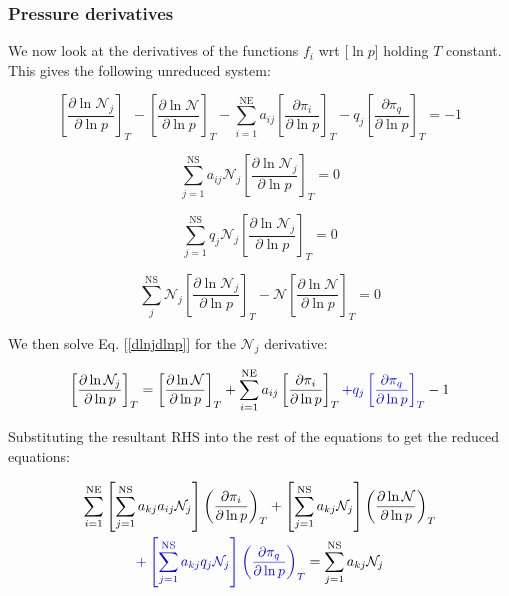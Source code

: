\documentclass[10pt]{article}
\begin{document}
\begin{flushleft}
\subsubsection{Pressure derivatives}
We now look at the derivatives of the functions $f_i$ wrt [$\ln p$] holding $T$ constant. This gives the following unreduced system:

\begin{equation}
\left[\frac{\partial \ln \mathcal{N}_j}{\partial \ln p}\right]_T - \left[ \frac{\partial \ln \mathcal{N}}{\partial \ln p} \right]_T - \sum_{i=1}^\text{NE} a_{ij} \left[ \frac{\partial \pi_i}{\partial \ln p} \right]_T - q_j \left[ \frac{\partial \pi_q}{\partial \ln p} \right]_T = -1 \label{dlnjdlnp}
\end{equation}

\begin{equation}
    \sum_{j=1}^\text{NS} a_{ij} \mathcal{N}_j \left[ \frac{\partial \ln \mathcal{N}_j}{\partial \ln p} \right]_T = 0 
\end{equation}

\begin{equation}
\sum_{j=1}^\text{NS} q_j \mathcal{N}_j \left[ \frac{\partial \ln \mathcal{N}_j}{\partial \ln p} \right]_T = 0 
\end{equation}

\begin{equation}
\sum_j^\text{NS} \mathcal{N}_j \left[ \frac{\partial \ln \mathcal{N}_j}{\partial \ln p} \right]_T - \mathcal{N} \left[ \frac{\partial \ln \mathcal{N}}{\partial \ln p} \right]_T = 0
\end{equation}

We then solve Eq. [\ref{dlnjdlnp}] for the $\mathcal{N}_j$ derivative:

\begin{equation}
    \left[\frac{\partial \ln \mathcal{N}_j}{\partial \ln p}\right]_T = \left[ \frac{\partial \ln \mathcal{N}}{\partial \ln p} \right]_T + \sum_{i=1}^\text{NE} a_{ij} \left[ \frac{\partial \pi_i}{\partial \ln p} \right]_T \textcolor{blue}{+ q_j \left[ \frac{\partial \pi_q}{\partial \ln p} \right]_T} - 1 
\end{equation}

Substituting the resultant RHS into the rest of the equations to get the reduced equations:

\begin{multline}
    \sum_{i=1}^\text{NE} \left[ \sum_{j=1}^\text{NS} a_{kj} a_{ij} \mathcal{N}_j \right] \left( \frac{\partial \pi_i}{\partial \ln p} \right)_T + \left[ \sum_{j=1}^\text{NS} a_{kj} \mathcal{N}_j \right] \left( \frac{\partial \ln \mathcal{N}}{\partial \ln p} \right)_T \\ \textcolor{blue}{+ \left[ \sum_{j=1}^\text{NS} a_{kj} q_j \mathcal{N}_j \right] \left( \frac{\partial \pi_q}{\partial \ln p} \right)_T } = \sum_{j=1}^\text{NS} a_{kj} \mathcal{N}_j
\end{multline}


\end{flushleft}
\end{document}
